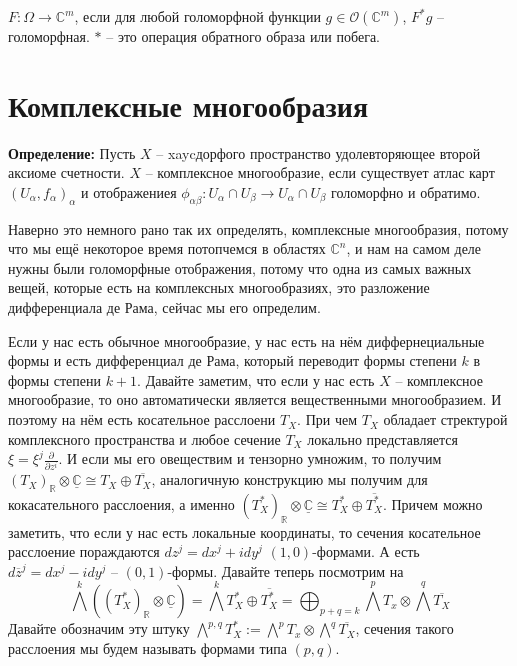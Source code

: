 $F:\Omega\rightarrow\mathbb C^m$, если для любой голоморфной функции $g\in
\mathcal O(\mathbb C^m)$, $F^*g$ – голоморфная. $*$ – это операция обратного
образа или побега.

\section{Комплексные многообразия}
\textbf{Определение:} Пусть $X$ – xaycдорфого пространство удолевторяющее второй
аксиоме счетности. $X$ – комплексное многообразие, если существует атлас карт
$(U_\alpha, f_\alpha)_\alpha$ и отображениея $\phi_{\alpha\beta}:U_\alpha\cap U_\beta
\rightarrow U_\alpha\cap U_\beta$ голоморфно и обратимо.

Наверно это немного рано так их определять, комплексные многообразия, потому что
мы ещё некоторое время потопчемся в областях $\mathbb C^n$, и нам на самом деле
нужны были голоморфные отображения, потому что одна из самых важных вещей, которые
есть на комплексных многообразиях, это разложение дифференциала де Рама, сейчас
мы его определим.

Если у нас есть обычное многообразие, у нас есть на нём диффернециальные формы
и есть дифференциал де Рама, который переводит формы степени $k$ в формы степени
$k+1$. Давайте заметим, что если у нас есть $X$ – комплексное многообразие, то
оно автоматически является вещественными многообразием. И поэтому на нём есть
косательное расслоени $T_X$. При чем $T_X$ обладает стректурой комплексного
пространства и любое сечение $T_X$ локально представляется $\xi=\xi^j\frac{\partial}
{\partial z^i}$. И если мы его овеществим и тензорно умножим, то получим
$(T_X)_{\mathbb R}\otimes\underline{\mathbb C}\cong T_X\oplus\overline{T_X}$,
аналогичную конструкцию мы получим для кокасательного расслоения, а именно 
$(T_X^*)_{\mathbb R}\otimes\underline{\mathbb C}\cong T_X^*\oplus\overline{T_X^*}$.
Причем можно заметить, что если у нас есть локальные координаты, то сечения
косательное расслоение пораждаются $dz^j=dx^j+idy^j$ $(1,0)$-формами. А есть
$d\overline z^j=dx^j-idy^j$ – $(0,1)$-формы. Давайте теперь посмотрим на
\[\bigwedge^k((T_X^*)_{\mathbb R}\otimes\underline{\mathbb C})=\bigwedge^kT_X^*
\oplus\overline{T_X^*}=\bigoplus_{p+q=k}\bigwedge^pT_x\otimes\bigwedge^q\overline{T_X}\]
Давайте обозначим эту штуку $\bigwedge^{p,q}T^*_X:=\bigwedge^pT_x\otimes
\bigwedge^q\overline{T_X}$, сечения такого расслоения мы будем называть формами
типа $(p,q)$.

